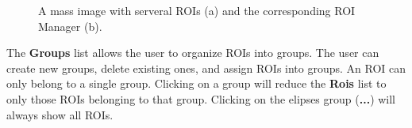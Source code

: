 \documentclass{article}
\begin{document}
	\begin{figure}[ht]
	\centering
	\hfill
	\caption{A mass image with serveral ROIs (a) and the corresponding ROI Manager (b). }
	\end{figure}
	
	The \textbf{Groups} list allows the user to organize ROIs into groups.
   The user can create new groups, delete existing ones, and assign ROIs into groups.
   An ROI can only belong to a single group. Clicking on a group will reduce the \textbf{Rois} 
   list to only those ROIs belonging to that group. Clicking on the elipses group
   (\textbf{...}) will always show all ROIs.
\end{document}

